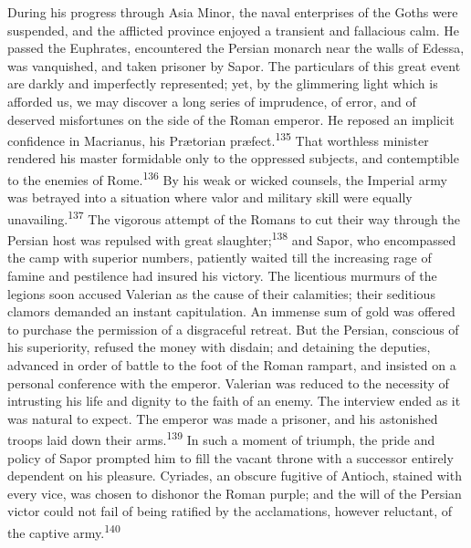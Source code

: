 During his progress through Asia Minor, the naval enterprises of
the Goths were suspended, and the afflicted province enjoyed a
transient and fallacious calm. He passed the Euphrates,
encountered the Persian monarch near the walls of Edessa, was
vanquished, and taken prisoner by Sapor. The particulars of this
great event are darkly and imperfectly represented; yet, by the
glimmering light which is afforded us, we may discover a long
series of imprudence, of error, and of deserved misfortunes on
the side of the Roman emperor. He reposed an implicit confidence
in Macrianus, his Prætorian præfect.\textsuperscript{135} That worthless minister
rendered his master formidable only to the oppressed subjects,
and contemptible to the enemies of Rome.\textsuperscript{136} By his weak or
wicked counsels, the Imperial army was betrayed into a situation
where valor and military skill were equally unavailing.\textsuperscript{137} The
vigorous attempt of the Romans to cut their way through the
Persian host was repulsed with great slaughter;\textsuperscript{138} and Sapor,
who encompassed the camp with superior numbers, patiently waited
till the increasing rage of famine and pestilence had insured his
victory. The licentious murmurs of the legions soon accused
Valerian as the cause of their calamities; their seditious
clamors demanded an instant capitulation. An immense sum of gold
was offered to purchase the permission of a disgraceful retreat.
But the Persian, conscious of his superiority, refused the money
with disdain; and detaining the deputies, advanced in order of
battle to the foot of the Roman rampart, and insisted on a
personal conference with the emperor. Valerian was reduced to the
necessity of intrusting his life and dignity to the faith of an
enemy. The interview ended as it was natural to expect. The
emperor was made a prisoner, and his astonished troops laid down
their arms.\textsuperscript{139} In such a moment of triumph, the pride and policy
of Sapor prompted him to fill the vacant throne with a successor
entirely dependent on his pleasure. Cyriades, an obscure fugitive
of Antioch, stained with every vice, was chosen to dishonor the
Roman purple; and the will of the Persian victor could not fail
of being ratified by the acclamations, however reluctant, of the
captive army.\textsuperscript{140}



